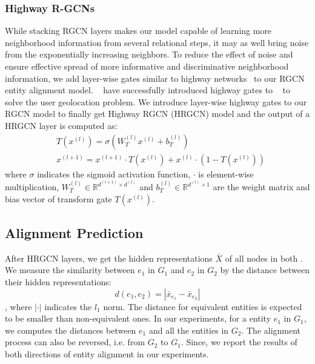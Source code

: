 	\subsubsection{Highway R-GCNs}
	\label{section:hgcn}
	While stacking RGCN layers makes our model capable of learning more neighborhood information from several relational steps, it may as well bring noise from the exponentially increasing neighbors. To reduce the effect of noise and ensure effective spread of more informative and discriminative neighborhood information, we add layer-wise gates similar to highway networks~\cite{Srivastava2015Highway} to our RGCN entity alignment model. ~\cite{Rahimi2018Semi} have successfully introduced highway gates to \GCNs~\cite{Kipf2016Semi} to solve the user geolocation problem. We introduce layer-wise highway gates to our RGCN model to finally get Highway RGCN (HRGCN) model and the output of a HRGCN layer is computed as:
	\begin{equation}
	\begin{split}
	&T(x^{(l)})=\sigma(W_T^{(l)}x^{(l)}+b_T^{(l)}) \\
	&x^{(l+1)}=x^{(l+1)} \cdot T(x^{(l)})+x^{(l)} \cdot (1-T(x^{(l)}))
	\end{split}
	\end{equation}
	where $\sigma$ indicates the sigmoid activation function, $\cdot$ is element-wise multiplication, $W_T^{(l)} \in \mathbb{R}^{d^{(l+1)} \times d^{(l)}}$ and $b_T^{(l)} \in \mathbb{R}^{d^{(l)} \times 1}$ are the weight matrix and bias vector of transform gate $T(x^{(l)})$.
	
	\subsection{Alignment Prediction}
	After HRGCN layers, we get the hidden representations $\bar{X}$ of all nodes in both \KGs. We measure the similarity between $e_1$ in $G_1$ and $e_2$ in $G_2$ by the distance between their hidden representations:
	\begin{equation}
	\label{d}
	d(e_1,e_2)=|\bar{x}_{e_1}-\bar{x}_{e_2}|
	\end{equation}
	, where $|\cdot|$ indicates the $l_1$ norm. The distance for equivalent entities is expected to be smaller than non-equivalent ones. In our experiments, for a entity $e_1$ in $G_1$, we computes the distances between $e_1$ and all the entities in $G_2$. The alignment process can also be reversed, i.e. from $G_2$ to $G_1$. Since, we report the results of both directions of entity alignment in our experiments.
	
